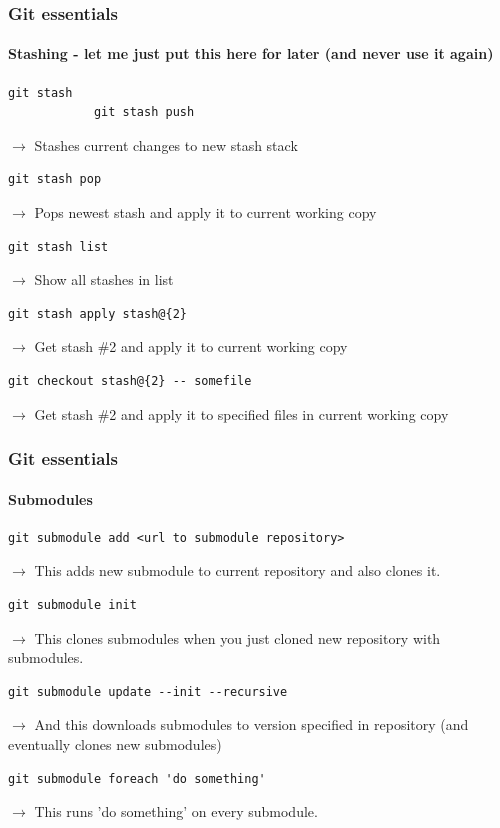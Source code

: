 \documentclass[aspectratio=169]{beamer}
\begin{document}
    \begin{frame}[fragile]
        \frametitle{Git essentials}
        \framesubtitle{Stashing - let me just put this here for later (and never use it again)}
        \begin{lstlisting}[gobble=12]
            git stash
            git stash push
        \end{lstlisting}
        $\rightarrow$ Stashes current changes to new stash stack
        \begin{lstlisting}[gobble=12]
            git stash pop
        \end{lstlisting}
        $\rightarrow$ Pops newest stash and apply it to current working copy
        \begin{lstlisting}[gobble=12]
            git stash list
        \end{lstlisting}
        $\rightarrow$ Show all stashes in list
        \begin{lstlisting}[gobble=12]
            git stash apply stash@{2}
        \end{lstlisting}
        $\rightarrow$ Get stash \#2 and apply it to current working copy
        \begin{lstlisting}[gobble=12]
            git checkout stash@{2} -- somefile
        \end{lstlisting}
        $\rightarrow$ Get stash \#2 and apply it to specified files in current working copy
    \end{frame}
    \begin{frame}[fragile]
        \frametitle{Git essentials}
        \framesubtitle{Submodules}
        \begin{lstlisting}[gobble=12]
            git submodule add <url to submodule repository>
        \end{lstlisting}
        $\rightarrow$ This adds new submodule to current repository and also clones it.\newline
        \begin{lstlisting}[gobble=12]
            git submodule init
        \end{lstlisting}
        $\rightarrow$ This clones submodules when you just cloned new repository with submodules.\newline
        \begin{lstlisting}[gobble=12]
            git submodule update --init --recursive
        \end{lstlisting}
        $\rightarrow$ And this downloads submodules to version specified in repository (and eventually clones new submodules)\newline
        \begin{lstlisting}[gobble=12]
            git submodule foreach 'do something'
        \end{lstlisting}
        $\rightarrow$ This runs 'do something' on every submodule.\newline
    \end{frame}
\end{document}
